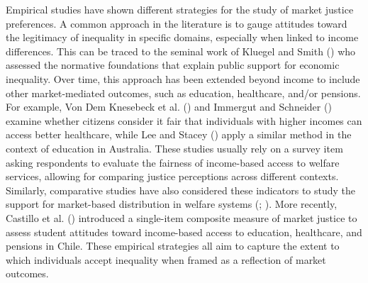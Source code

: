 \documentclass[
  12pt,
]{article}
\begin{document}
Empirical studies have shown different strategies for the study of
market justice preferences. A common approach in the literature is to
gauge attitudes toward the legitimacy of inequality in specific domains,
especially when linked to income differences. This can be traced to the
seminal work of Kluegel and Smith
() who assessed the normative
foundations that explain public support for economic inequality. Over
time, this approach has been extended beyond income to include other
market-mediated outcomes, such as education, healthcare, and/or
pensions. For example, Von Dem Knesebeck et al.
() and Immergut and
Schneider () examine whether
citizens consider it fair that individuals with higher incomes can
access better healthcare, while Lee and Stacey
() apply a similar method in the
context of education in Australia. These studies usually rely on a
survey item asking respondents to evaluate the fairness of income-based
access to welfare services, allowing for comparing justice perceptions
across different contexts. Similarly, comparative studies have also
considered these indicators to study the support for market-based
distribution in welfare systems (; ). More
recently, Castillo et al.
() introduced a
single-item composite measure of market justice to assess student
attitudes toward income-based access to education, healthcare, and
pensions in Chile. These empirical strategies all aim to capture the
extent to which individuals accept inequality when framed as a
reflection of market outcomes.
\end{document}
